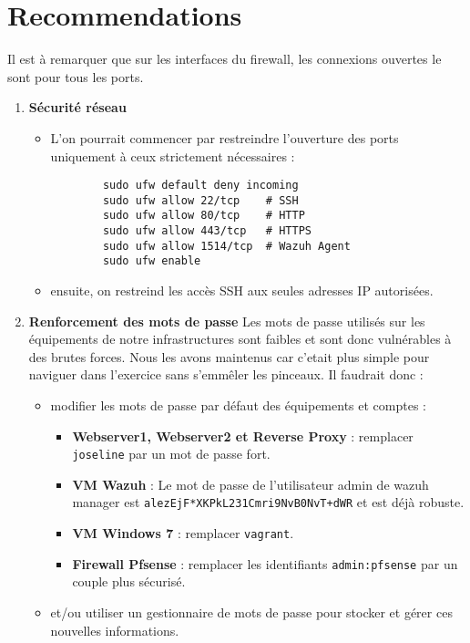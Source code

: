 \documentclass[a4paper,12pt]{report}
\begin{document}
\section{Recommendations}
Il est à remarquer que sur les interfaces du firewall, les connexions ouvertes le sont pour tous les ports. 
\begin{enumerate}
    \item \textbf{Sécurité réseau}
    \begin{itemize}
        \item L'on pourrait commencer par restreindre l’ouverture des ports uniquement à ceux strictement nécessaires :
        \begin{lstlisting}
        sudo ufw default deny incoming
        sudo ufw allow 22/tcp    # SSH
        sudo ufw allow 80/tcp    # HTTP
        sudo ufw allow 443/tcp   # HTTPS
        sudo ufw allow 1514/tcp  # Wazuh Agent
        sudo ufw enable
        \end{lstlisting}
        \item ensuite, on restreind les accès SSH aux seules adresses IP autorisées.
    \end{itemize}

    \item \textbf{Renforcement des mots de passe}
    Les mots de passe utilisés sur les équipements de notre infrastructures sont faibles et sont donc vulnérables à des brutes forces. Nous les avons maintenus car c'etait plus simple pour naviguer dans l'exercice sans s'emmêler les pinceaux. Il faudrait donc :
    \begin{itemize}
        \item modifier les mots de passe par défaut des équipements et comptes :
        \begin{itemize}
            \item \textbf{Webserver1, Webserver2 et Reverse Proxy} : remplacer \texttt{joseline} par un mot de passe fort.
            \item \textbf{VM Wazuh} : Le mot de passe de l'utilisateur admin de wazuh manager est \texttt{alezEjF*XKPkL231Cmri9NvB0NvT+dWR} et est déjà robuste.
            \item \textbf{VM Windows 7} : remplacer \texttt{vagrant}.
            \item \textbf{Firewall Pfsense} : remplacer les identifiants \texttt{admin:pfsense} par un couple plus sécurisé.
        \end{itemize}
        \item et/ou utiliser un gestionnaire de mots de passe pour stocker et gérer ces nouvelles informations.
    \end{itemize}


\end{enumerate}
\end{document}
